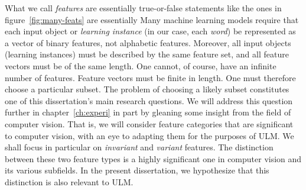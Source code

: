 What we call \emph{features} are essentially true-or-false statements like the ones in figure~\ref{fig:many-feats} are essentially 
Many machine learning models require that each input object or \emph{learning instance} 
(in our case, each \emph{word}) be represented as a vector of binary features, not alphabetic 
features. Moreover, all input objects (learning instances) must be described by the same feature 
set, and all feature vectors must be of the same length.
One cannot, of course, have an infinite number of features. Feature vectors must be finite in length.
One must therefore choose a particular subset. The problem of choosing a likely subset constitutes one of
this dissertation's main research questions. 
We will address this question further in chapter~\ref{ch:experi} in part by gleaning some insight
from the field of computer vision. That is, we will consider feature categories that 
are significant to computer vision, with an eye to adapting them for the purposes of ULM. 
We shall focus in particular on \emph{invariant} and \emph{variant} features.
The distinction between these two feature types is a highly significant one in
computer vision and its various subfields. In the present dissertation, we hypothesize that this distinction is
also relevant to ULM. 


